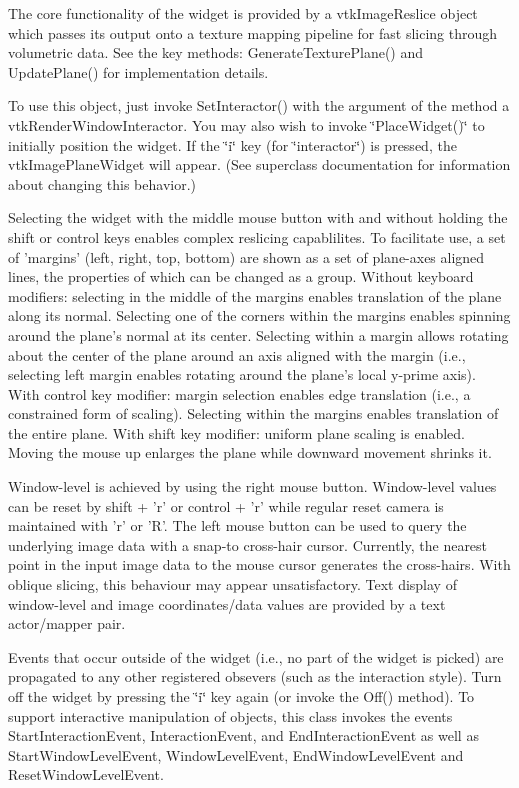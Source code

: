 The core functionality of the widget is provided by a vtk\-Image\-Reslice object which passes its output onto a texture mapping pipeline for fast slicing through volumetric data. See the key methods\-: Generate\-Texture\-Plane() and Update\-Plane() for implementation details.

To use this object, just invoke Set\-Interactor() with the argument of the method a vtk\-Render\-Window\-Interactor. You may also wish to invoke \char`\"{}\-Place\-Widget()\char`\"{} to initially position the widget. If the \char`\"{}i\char`\"{} key (for \char`\"{}interactor\char`\"{}) is pressed, the vtk\-Image\-Plane\-Widget will appear. (See superclass documentation for information about changing this behavior.)

Selecting the widget with the middle mouse button with and without holding the shift or control keys enables complex reslicing capablilites. To facilitate use, a set of 'margins' (left, right, top, bottom) are shown as a set of plane-\/axes aligned lines, the properties of which can be changed as a group. Without keyboard modifiers\-: selecting in the middle of the margins enables translation of the plane along its normal. Selecting one of the corners within the margins enables spinning around the plane's normal at its center. Selecting within a margin allows rotating about the center of the plane around an axis aligned with the margin (i.\-e., selecting left margin enables rotating around the plane's local y-\/prime axis). With control key modifier\-: margin selection enables edge translation (i.\-e., a constrained form of scaling). Selecting within the margins enables translation of the entire plane. With shift key modifier\-: uniform plane scaling is enabled. Moving the mouse up enlarges the plane while downward movement shrinks it.

Window-\/level is achieved by using the right mouse button. Window-\/level values can be reset by shift + 'r' or control + 'r' while regular reset camera is maintained with 'r' or 'R'. The left mouse button can be used to query the underlying image data with a snap-\/to cross-\/hair cursor. Currently, the nearest point in the input image data to the mouse cursor generates the cross-\/hairs. With oblique slicing, this behaviour may appear unsatisfactory. Text display of window-\/level and image coordinates/data values are provided by a text actor/mapper pair.

Events that occur outside of the widget (i.\-e., no part of the widget is picked) are propagated to any other registered obsevers (such as the interaction style). Turn off the widget by pressing the \char`\"{}i\char`\"{} key again (or invoke the Off() method). To support interactive manipulation of objects, this class invokes the events Start\-Interaction\-Event, Interaction\-Event, and End\-Interaction\-Event as well as Start\-Window\-Level\-Event, Window\-Level\-Event, End\-Window\-Level\-Event and Reset\-Window\-Level\-Event.

